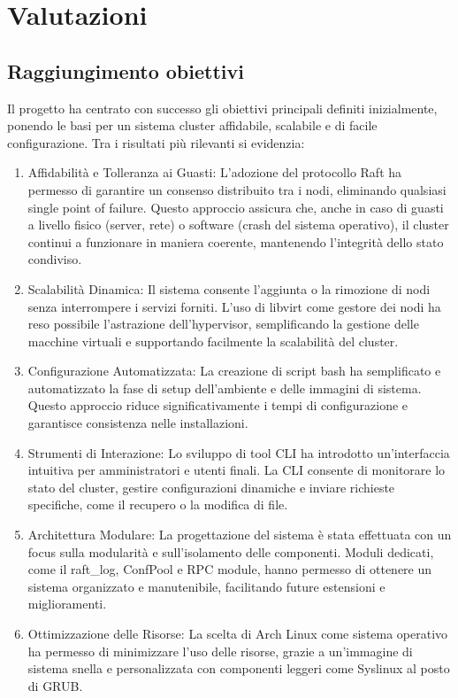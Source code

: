 
\section{Valutazioni}
\subsection{Raggiungimento obiettivi}
Il progetto ha centrato con successo gli obiettivi principali definiti inizialmente, ponendo le basi per un sistema 
cluster affidabile, scalabile e di facile configurazione. Tra i risultati più rilevanti si evidenzia:
\begin{enumerate}
  \item Affidabilità e Tolleranza ai Guasti: L'adozione del protocollo Raft ha permesso di garantire 
  un consenso distribuito tra i nodi, eliminando qualsiasi single point of failure. Questo approccio assicura 
  che, anche in caso di guasti a livello fisico (server, rete) o software (crash del sistema operativo), 
  il cluster continui a funzionare in maniera coerente, mantenendo l'integrità dello stato condiviso.
  
  \item Scalabilità Dinamica: Il sistema consente l'aggiunta o la rimozione di nodi senza interrompere
  i servizi forniti. L'uso di libvirt come gestore dei nodi ha reso possibile l’astrazione dell’hypervisor,
  semplificando la gestione delle macchine virtuali e supportando facilmente la scalabilità del cluster.

  \item Configurazione Automatizzata: La creazione di script bash ha semplificato e automatizzato la fase 
  di setup dell’ambiente e delle immagini di sistema. Questo approccio riduce significativamente 
  i tempi di configurazione e garantisce consistenza nelle installazioni.

  \item Strumenti di Interazione: Lo sviluppo di tool CLI ha introdotto un'interfaccia intuitiva per 
  amministratori e utenti finali. La CLI consente di monitorare lo stato del cluster, gestire 
  configurazioni dinamiche e inviare richieste specifiche, come il recupero o la modifica di file.

  \item Architettura Modulare: La progettazione del sistema è stata effettuata con un focus sulla modularità
  e sull’isolamento delle componenti. Moduli dedicati, come il raft\_log, ConfPool e RPC module, hanno permesso
  di ottenere un sistema organizzato e manutenibile, facilitando future estensioni e miglioramenti.

  \item Ottimizzazione delle Risorse: La scelta di Arch Linux come sistema operativo ha permesso di minimizzare l’uso delle 
  risorse, grazie a un’immagine di sistema snella e personalizzata con componenti leggeri come Syslinux al posto di GRUB.
\end{enumerate}

